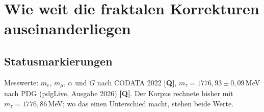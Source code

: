 
\providecommand{\BM}{\textbf{[B]}}
\providecommand{\KM}{\textbf{[K]}}
\providecommand{\SM}{\textbf{[S]}}
\providecommand{\XM}{\textbf{[X]}}
\providecommand{\QM}{\textbf{[Q]}}

\chapter*{Wie weit die fraktalen Korrekturen auseinanderliegen}

\begin{abstract}
Die Grundform der FFGFT ist verhältnisbasiert; eine fraktale Korrektur tritt nur bei der
Übersetzung in SI-Einheiten auf. Der Korpus führt dafür als Grundsatz einen einzigen Faktor,
$K_{\text{frak}}=1-100\xi=74/75$, den Pro-Schritt-Faktor der Skalen-Rekursion (Dok.~133, 300, 384).
In den einzelnen Rechnungen stehen aber verschiedene Werte und Reste nebeneinander (R154). Dieses
Dokument schreibt jeden von ihnen als $n$ in $K=1-n\,\xi$, vergleicht ihn mit $n=100$ und sortiert
nach Herkunft. Ergebnis: Von allen Kandidaten ist nur einer ein echter Test der SI-Übersetzung, die
Feinstrukturkonstante, und auch sie nur zusammen mit der Verankerung der Massen in MeV; sie verlangt $n=101{,}25$, also $1{,}25\,\xi$ neben der Regel. Alle anderen
Abweichungen sind algebraische Folgen, angepasste Größen, andere Größen unter demselben Namen oder
der Abstand der Leptonleiter zur Koide-Form. Die Leptonreste sind damit keine Rekursion der Messung,
sondern ein Näherungsfehler der Leiter, den die Koide-Form ohne Messwert vorhersagt. Die einheitliche
Regel ist nicht widerlegt; sie ist bisher genau einmal geprüft. Setzt man die Energieeinheit so, dass
$m_em_\mu=54$ gilt, liegt die Regel nur noch $0{,}06\,\xi$ neben $\alpha$, und zwar in additiver
Form; das ist eine Zuordnung des Restes, keine Vorhersage.
\end{abstract}

\section*{Statusmarkierungen}

Messwerte: $m_e$, $m_\mu$, $\alpha$ und $G$ nach CODATA 2022 \QM, $m_\tau=1776{,}93\pm0{,}09$\,MeV
nach PDG (pdgLive, Ausgabe 2026) \QM. Der Korpus rechnete bisher mit $m_\tau=1776{,}86$\,MeV; wo das
einen Unterschied macht, stehen beide Werte.

